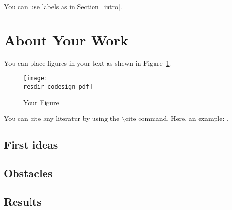 \par


\par
You can use labels as in Section~\ref{intro}.

\section{About Your Work}
You can place figures in your text as shown in Figure~\ref{yourfigure}.
\begin{figure}
\centering
\texttt{[image: \\resdir codesign.pdf]}
\caption{\label{yourfigure}Your Figure}
\end{figure}
\par
You can cite any literatur by using the $\backslash$cite command. 
Here, an example: \cite{btt:1998}.
\subsection{First ideas}
\subsection{Obstacles}
\subsection{Results}

\clearpage
\appendix




